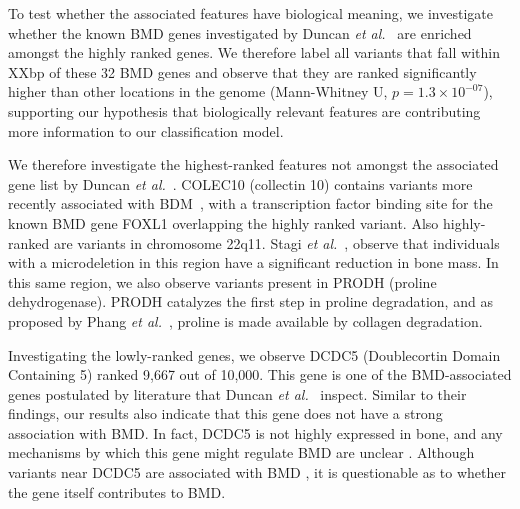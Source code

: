 \documentclass[10pt,letterpaper]{article}
\begin{document}
To test whether the associated features have biological meaning, we investigate whether the known BMD genes investigated by Duncan {\it et al.}~\cite{Duncan.2011} are enriched amongst the 
highly ranked genes. We therefore label all variants that fall within XXbp of these 32 BMD genes and observe that they are
ranked significantly higher than other locations in the genome (Mann-Whitney U, $p=1.3\times10^{-07}$), supporting our hypothesis that biologically relevant features are contributing more information to our classification model.

We therefore investigate the highest-ranked features not amongst the associated gene list by Duncan {\it et al.}~\cite{Duncan.2011}. 
COLEC10 (collectin 10) contains variants more recently associated with BDM~\cite{Kemp2014,Liu2008}, with a transcription factor binding site for the known BMD gene FOXL1 overlapping the highly ranked variant.
Also highly-ranked are variants in chromosome 22q11. Stagi {\it et al.}~\cite{Stagi.2010}, observe that individuals with a
microdeletion in this region have a significant reduction in bone mass. In this same region, we also observe
variants present in PRODH (proline dehydrogenase). PRODH catalyzes the first step in proline degradation, and as
proposed by Phang {\it et al.}~\cite{Phang.2008}, proline is made available by collagen degradation.

Investigating the lowly-ranked genes, we observe DCDC5 (Doublecortin Domain Containing 5) ranked 9,667 out of 10,000. This gene is 
one of the BMD-associated genes postulated by literature that Duncan {\it et al.}~\cite{Duncan.2011} inspect.
Similar to their findings, our results also indicate that this gene does not have a strong association with BMD. 
In fact, DCDC5 is not highly expressed in bone, and any mechanisms by which this gene might regulate BMD are unclear \cite{Thakker2012}. 
Although variants near DCDC5 are associated with BMD \cite{Rivadeneira2009}, it is questionable as to whether the gene itself contributes to BMD.
\end{document}
